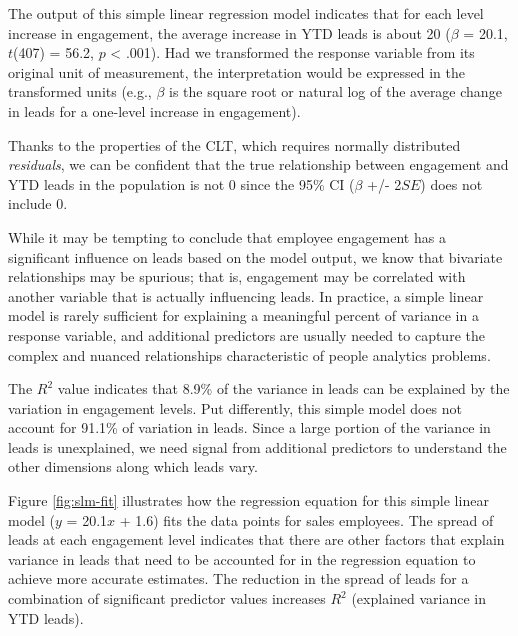 \documentclass[
]{book}
\begin{document}
The output of this simple linear regression model indicates that for each level increase in engagement, the average increase in YTD leads is about 20 (\(\beta\) = 20.1, \(t\)(407) = 56.2, \(p\) \textless{} .001). Had we transformed the response variable from its original unit of measurement, the interpretation would be expressed in the transformed units (e.g., \(\beta\) is the square root or natural log of the average change in leads for a one-level increase in engagement).

Thanks to the properties of the CLT, which requires normally distributed \emph{residuals}, we can be confident that the true relationship between engagement and YTD leads in the population is not 0 since the 95\% CI (\(\beta\) +/- 2\(SE\)) does not include 0.

While it may be tempting to conclude that employee engagement has a significant influence on leads based on the model output, we know that bivariate relationships may be spurious; that is, engagement may be correlated with another variable that is actually influencing leads. In practice, a simple linear model is rarely sufficient for explaining a meaningful percent of variance in a response variable, and additional predictors are usually needed to capture the complex and nuanced relationships characteristic of people analytics problems.

The \(R^2\) value indicates that 8.9\% of the variance in leads can be explained by the variation in engagement levels. Put differently, this simple model does not account for 91.1\% of variation in leads. Since a large portion of the variance in leads is unexplained, we need signal from additional predictors to understand the other dimensions along which leads vary.

Figure \ref{fig:slm-fit} illustrates how the regression equation for this simple linear model (\(y\) = 20.1\(x\) + 1.6) fits the data points for sales employees. The spread of leads at each engagement level indicates that there are other factors that explain variance in leads that need to be accounted for in the regression equation to achieve more accurate estimates. The reduction in the spread of leads for a combination of significant predictor values increases \(R^2\) (explained variance in YTD leads).
\end{document}
